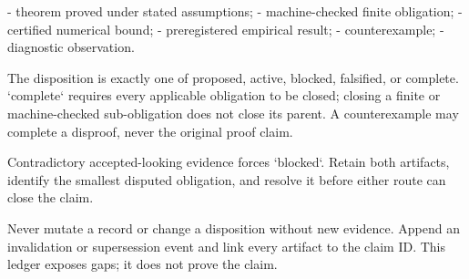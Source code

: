 \documentclass[11pt]{article}
\begin{document}
\begin{markdown}
- theorem proved under stated assumptions;
- machine-checked finite obligation;
- certified numerical bound;
- preregistered empirical result;
- counterexample;
- diagnostic observation.

The disposition is exactly one of proposed, active, blocked, falsified, or complete. `complete`
requires every applicable obligation to be closed; closing a finite or machine-checked
sub-obligation does not close its parent. A counterexample may complete a disproof, never the
original proof claim.

Contradictory accepted-looking evidence forces `blocked`. Retain both artifacts, identify the
smallest disputed obligation, and resolve it before either route can close the claim.

Never mutate a record or change a disposition without new evidence. Append an invalidation or
supersession event and link every artifact to the claim ID. This ledger exposes gaps; it does not
prove the claim.
\end{markdown}
\end{document}
